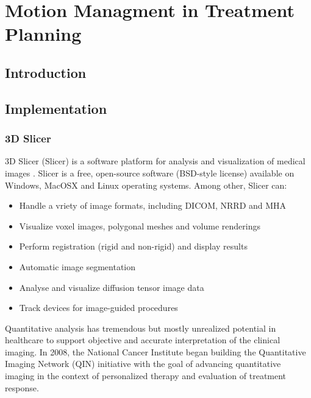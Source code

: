 \documentclass[type=dr, dr=rernat, accentcolor=tud7b,colorbacktitle, bigchapter, openright, twoside, 12pt ]{tudthesis}
\begin{document}
\chapter{Motion Managment in Treatment Planning}
\label{chapter:intro}
\minitoc

\section{Introduction}

\section{Implementation}

\subsection{3D Slicer}

3D Slicer (Slicer) is a software platform for analysis and visualization of medical images \cite{Slicer, Fedorov2012}. Slicer is a free, open-source software (BSD-style license) available on Windows, MacOSX and Linux operating systems. Among other, Slicer can:

\begin{itemize}
	\item Handle a vriety of image formats, including DICOM, NRRD and MHA
	\item Visualize voxel images, polygonal meshes and volume renderings
	\item Perform registration (rigid and non-rigid) and display results
	\item Automatic image segmentation
	\item Analyse and visualize diffusion tensor image data
	\item Track devices for image-guided procedures
\end{itemize}


Quantitative analysis has tremendous but mostly unrealized potential in healthcare to support objective and accurate interpretation of the clinical imaging. 
In 2008, the National Cancer Institute began building the Quantitative Imaging Network (QIN) initiative with the goal of advancing quantitative imaging in 
the context of personalized therapy and evaluation of treatment response.
\end{document}
